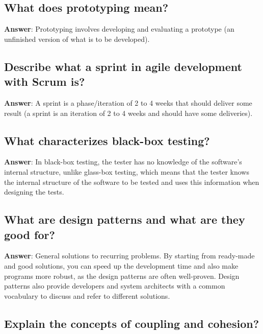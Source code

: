 \documentclass[a4paper,11pt,oneside]{article}
\begin{document}
\begin{sloppypar}
\subsection{What does prototyping mean?}

\label{q:235:sa:en:True}

\textbf{Answer}: Prototyping involves developing and evaluating a prototype (an unfinished version of what is to be developed).



\subsection{Describe what a sprint in agile development with Scrum is?}

\label{q:236:sa:en:True}

\textbf{Answer}: A sprint is a phase/iteration of 2 to 4 weeks that should deliver some result (a sprint is an iteration of 2 to 4 weeks and should have some deliveries).



\subsection{What characterizes black-box testing?}

\label{q:237:sa:en:True}

\textbf{Answer}: In black-box testing, the tester has no knowledge of the software's internal structure, unlike glass-box testing, which means that the tester knows the internal structure of the software to be tested and uses this information when designing the tests.



\subsection{What are design patterns and what are they good for?}

\label{q:238:sa:en:True}

\textbf{Answer}: General solutions to recurring problems. By starting from ready-made and good solutions, you can speed up the development time and also make programs more robust, as the design patterns are often well-proven. Design patterns also provide developers and system architects with a common vocabulary to discuss and refer to different solutions.



\subsection{Explain the concepts of coupling and cohesion?}


\end{sloppypar}
\end{document}
